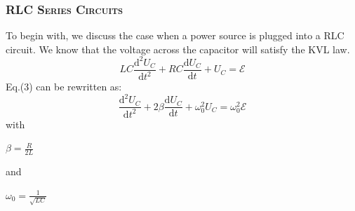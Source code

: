 \documentclass[a4paper,12pt]{article}
\begin{document}
\subsubsection{\textsc{RLC Series Circuits}}
To begin with, we discuss the case when a power source is plugged into a RLC circuit. We know that the voltage across the capacitor will satisfy the KVL law.
\begin{equation}
L C \frac{\mathrm{d}^{2} U_{C}}{\mathrm{d} t^{2}}+R C \frac{\mathrm{d} U_{C}}{\mathrm{d} t}+U_{C}=\mathcal{E}
\end{equation} 
Eq.(3) can be rewritten as:
\begin{equation}
\frac{\mathrm{d}^{2} U_{C}}{\mathrm{d} t^{2}}+2 \beta \frac{\mathrm{d} U_{C}}{\mathrm{d} t}+\omega_{0}^{2} U_{C}=\omega_{0}^{2} \mathcal{E}
\end{equation}
with 
\begin{center}
$\displaystyle \beta=\frac{R}{2 L}$ 
\end{center}
and 
\begin{center}
$\displaystyle \omega_{0}=\frac{1}{\sqrt{L C}}$ 
\end{center}
\end{document}

